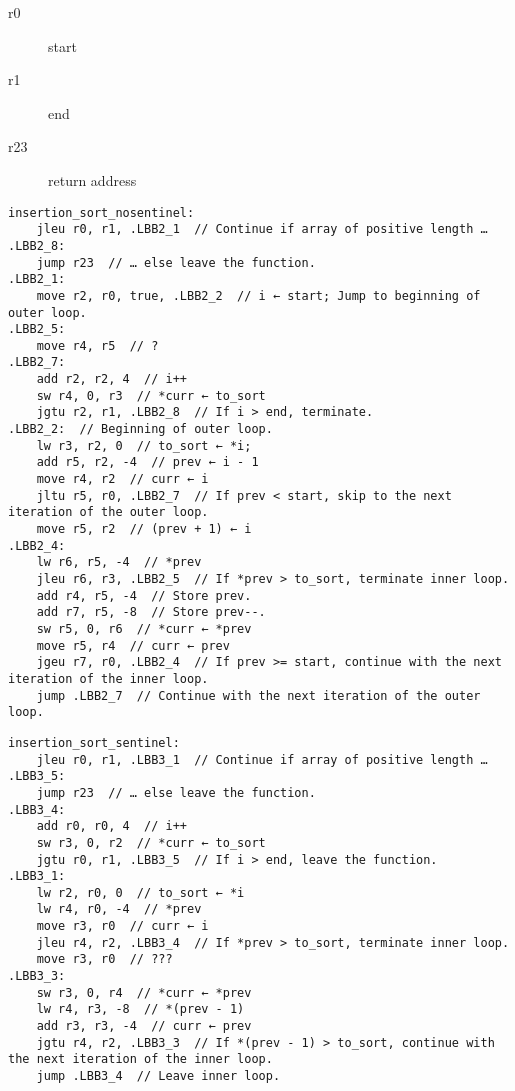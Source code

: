\begin{description}
	\item[r0] start
	\item[r1] end
	\item[r23] return address
\end{description}
\begin{verbatim}
insertion_sort_nosentinel:
    jleu r0, r1, .LBB2_1  // Continue if array of positive length …
.LBB2_8:
    jump r23  // … else leave the function.
.LBB2_1:
    move r2, r0, true, .LBB2_2  // i ← start; Jump to beginning of outer loop.
.LBB2_5:
    move r4, r5  // ?
.LBB2_7:
    add r2, r2, 4  // i++
    sw r4, 0, r3  // *curr ← to_sort
    jgtu r2, r1, .LBB2_8  // If i > end, terminate.
.LBB2_2:  // Beginning of outer loop.
    lw r3, r2, 0  // to_sort ← *i;
    add r5, r2, -4  // prev ← i - 1
    move r4, r2  // curr ← i
    jltu r5, r0, .LBB2_7  // If prev < start, skip to the next iteration of the outer loop.
    move r5, r2  // (prev + 1) ← i
.LBB2_4:
    lw r6, r5, -4  // *prev
    jleu r6, r3, .LBB2_5  // If *prev > to_sort, terminate inner loop.
    add r4, r5, -4  // Store prev.
    add r7, r5, -8  // Store prev--.
    sw r5, 0, r6  // *curr ← *prev
    move r5, r4  // curr ← prev
    jgeu r7, r0, .LBB2_4  // If prev >= start, continue with the next iteration of the inner loop.
    jump .LBB2_7  // Continue with the next iteration of the outer loop.
\end{verbatim}

\begin{verbatim}
insertion_sort_sentinel:
    jleu r0, r1, .LBB3_1  // Continue if array of positive length …
.LBB3_5:
    jump r23  // … else leave the function.
.LBB3_4:
    add r0, r0, 4  // i++
    sw r3, 0, r2  // *curr ← to_sort
    jgtu r0, r1, .LBB3_5  // If i > end, leave the function.
.LBB3_1:
    lw r2, r0, 0  // to_sort ← *i
    lw r4, r0, -4  // *prev
    move r3, r0  // curr ← i
    jleu r4, r2, .LBB3_4  // If *prev > to_sort, terminate inner loop.
    move r3, r0  // ???
.LBB3_3:
    sw r3, 0, r4  // *curr ← *prev
    lw r4, r3, -8  // *(prev - 1)
    add r3, r3, -4  // curr ← prev
    jgtu r4, r2, .LBB3_3  // If *(prev - 1) > to_sort, continue with the next iteration of the inner loop.
    jump .LBB3_4  // Leave inner loop.
\end{verbatim}